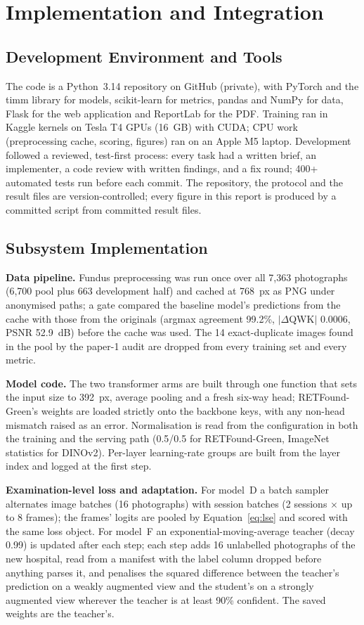 \chapter{Implementation and Integration}\label{ch:implementation}
\section{Development Environment and Tools}
The code is a Python~3.14 repository on GitHub (private), with PyTorch and the timm library for models, scikit-learn for metrics, pandas and NumPy for data, Flask for the web application and ReportLab for the PDF. Training ran in Kaggle kernels on Tesla T4 GPUs (16~GB) with CUDA; CPU work (preprocessing cache, scoring, figures) ran on an Apple M5 laptop. Development followed a reviewed, test-first process: every task had a written brief, an implementer, a code review with written findings, and a fix round; 400+ automated tests run before each commit. The repository, the protocol and the result files are version-controlled; every figure in this report is produced by a committed script from committed result files.

\section{Subsystem Implementation}
\textbf{Data pipeline.} Fundus preprocessing was run once over all 7{,}363 photographs (6{,}700 pool plus 663 development half) and cached at 768~px as PNG under anonymised paths; a gate compared the baseline model's predictions from the cache with those from the originals (argmax agreement 99.2\%, $|\Delta$QWK$|$ 0.0006, PSNR 52.9~dB) before the cache was used. The 14 exact-duplicate images found in the pool by the paper-1 audit are dropped from every training set and every metric.

\textbf{Model code.} The two transformer arms are built through one function that sets the input size to 392~px, average pooling and a fresh six-way head; RETFound-Green's weights are loaded strictly onto the backbone keys, with any non-head mismatch raised as an error. Normalisation is read from the configuration in both the training and the serving path (0.5/0.5 for RETFound-Green, ImageNet statistics for DINOv2). Per-layer learning-rate groups are built from the layer index and logged at the first step.

\textbf{Examination-level loss and adaptation.} For model~D a batch sampler alternates image batches (16 photographs) with session batches (2 sessions $\times$ up to 8 frames); the frames' logits are pooled by Equation~\ref{eq:lse} and scored with the same loss object. For model~F an exponential-moving-average teacher (decay 0.99) is updated after each step; each step adds 16 unlabelled photographs of the new hospital, read from a manifest with the label column dropped before anything parses it, and penalises the squared difference between the teacher's prediction on a weakly augmented view and the student's on a strongly augmented view wherever the teacher is at least 90\% confident. The saved weights are the teacher's.

